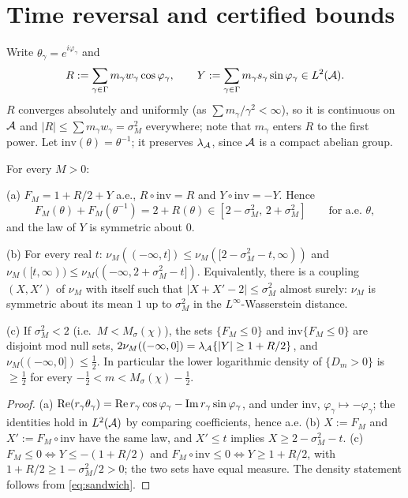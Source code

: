 \section{Time reversal and certified bounds}\label{sec:reversal}

Write $\theta_\gamma=e^{i\varphi_\gamma}$ and
\[
R:=\sum_{\gamma\in\Gamma}m_\gamma w_\gamma\cos\varphi_\gamma,\qquad Y:=\sum_{\gamma\in\Gamma}m_\gamma s_\gamma\sin\varphi_\gamma\in L^2(\mathcal A).
\]
$R$ converges absolutely and uniformly (as $\sum m_\gamma/\gamma^2<\infty$), so it is continuous on $\mathcal A$ and $|R|\le\sum m_\gamma w_\gamma=\sigma_M^2$ everywhere; note that $m_\gamma$ enters $R$ to the first power. Let $\mathrm{inv}(\theta)=\theta^{-1}$; it preserves $\lambda_{\mathcal A}$, since $\mathcal A$ is a compact abelian group.

\begin{theorem}\label{thm:reversal}
For every $M>0$:

\textup{(a)} $F_M=1+R/2+Y$ a.e., $R\circ\mathrm{inv}=R$ and $Y\circ\mathrm{inv}=-Y$. Hence
\[
F_M(\theta)+F_M(\theta^{-1})=2+R(\theta)\in[2-\sigma_M^2,\,2+\sigma_M^2]\qquad\text{for a.e. }\theta,
\]
and the law of $Y$ is symmetric about $0$.

\textup{(b)} For every real $t$: $\nu_M((-\infty,t])\le\nu_M([2-\sigma_M^2-t,\infty))$ and $\nu_M([t,\infty))\le\nu_M((-\infty,2+\sigma_M^2-t])$. Equivalently, there is a coupling $(X,X')$ of $\nu_M$ with itself such that $|X+X'-2|\le\sigma_M^2$ almost surely: $\nu_M$ is symmetric about its mean $1$ up to $\sigma_M^2$ in the $L^\infty$-Wasserstein distance.

\textup{(c)} If $\sigma_M^2<2$ (i.e.\ $M<M_\sigma(\chi)$), the sets $\{F_M\le0\}$ and $\mathrm{inv}\{F_M\le0\}$ are disjoint mod null sets, $2\nu_M((-\infty,0])=\lambda_{\mathcal A}\{|Y|\ge1+R/2\}$, and $\nu_M((-\infty,0])\le\frac12$. In particular the lower logarithmic density of $\{D_m>0\}$ is $\ge\frac12$ for every $-\frac12<m<M_\sigma(\chi)-\frac12$.
\end{theorem}

\begin{proof}
(a) $\operatorname{Re}(r_\gamma\theta_\gamma)=\operatorname{Re} r_\gamma\cos\varphi_\gamma-\operatorname{Im} r_\gamma\sin\varphi_\gamma$, and under $\mathrm{inv}$, $\varphi_\gamma\mapsto-\varphi_\gamma$; the identities hold in $L^2(\mathcal A)$ by comparing coefficients, hence a.e. (b) $X:=F_M$ and $X':=F_M\circ\mathrm{inv}$ have the same law, and $X'\le t$ implies $X\ge2-\sigma_M^2-t$. (c) $F_M\le0\iff Y\le-(1+R/2)$ and $F_M\circ\mathrm{inv}\le0\iff Y\ge1+R/2$, with $1+R/2\ge1-\sigma_M^2/2>0$; the two sets have equal measure. The density statement follows from \eqref{eq:sandwich}.
\end{proof}

